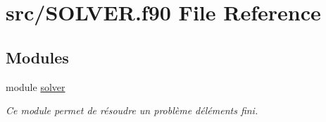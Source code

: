 \hypertarget{_s_o_l_v_e_r_8f90}{}\section{src/\+S\+O\+L\+V\+ER.f90 File Reference}
\label{_s_o_l_v_e_r_8f90}
\subsection*{Modules}
\begin{DoxyCompactItemize}
\item 
module \hyperlink{namespacesolver}{solver}
\begin{DoxyCompactList}\small\item\em Ce module permet de résoudre un problème d\textquotesingle{}éléments fini. \end{DoxyCompactList}\end{DoxyCompactItemize}
